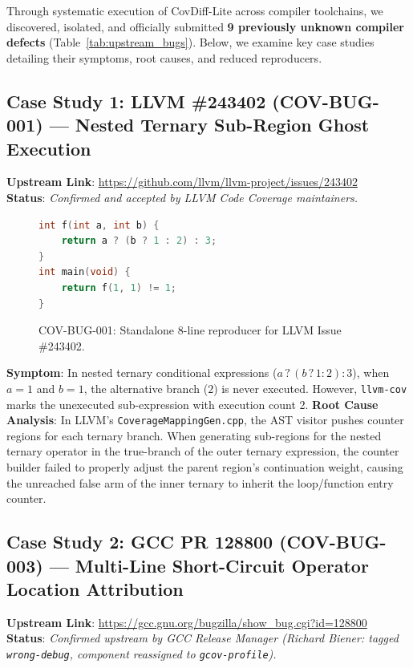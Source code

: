 \documentclass[sigconf,review,anonymous=false]{acmart}
\theoremstyle{definition}
\begin{document}
Through systematic execution of CovDiff-Lite across compiler toolchains, we discovered, isolated, and officially submitted \textbf{9 previously unknown compiler defects} (Table~\ref{tab:upstream_bugs}). Below, we examine key case studies detailing their symptoms, root causes, and reduced reproducers.

\subsection{Case Study 1: LLVM \#243402 (COV-BUG-001) — Nested Ternary Sub-Region Ghost Execution}
\textbf{Upstream Link}: \url{https://github.com/llvm/llvm-project/issues/243402} \\
\textbf{Status}: \textit{Confirmed and accepted by LLVM Code Coverage maintainers.}

\begin{figure}[h]
\begin{lstlisting}[language=C]
int f(int a, int b) {
    return a ? (b ? 1 : 2) : 3;
}
int main(void) {
    return f(1, 1) != 1;
}
\end{lstlisting}
\caption{COV-BUG-001: Standalone 8-line reproducer for LLVM Issue \#243402.}
\label{fig:repro_bug001}
\end{figure}

\textbf{Symptom}: In nested ternary conditional expressions ($a \,?\, (b \,?\, 1 : 2) : 3$), when $a=1$ and $b=1$, the alternative branch ($2$) is never executed. However, \texttt{llvm-cov} marks the unexecuted sub-expression with execution count 2.
\textbf{Root Cause Analysis}: In LLVM's \texttt{CoverageMappingGen.cpp}, the AST visitor pushes counter regions for each ternary branch. When generating sub-regions for the nested ternary operator in the true-branch of the outer ternary expression, the counter builder failed to properly adjust the parent region's continuation weight, causing the unreached false arm of the inner ternary to inherit the loop/function entry counter.

\subsection{Case Study 2: GCC PR 128800 (COV-BUG-003) — Multi-Line Short-Circuit Operator Location Attribution}
\textbf{Upstream Link}: \url{https://gcc.gnu.org/bugzilla/show_bug.cgi?id=128800} \\
\textbf{Status}: \textit{Confirmed upstream by GCC Release Manager (Richard Biener: tagged \texttt{wrong-debug}, component reassigned to \texttt{gcov-profile}).}
\end{document}
